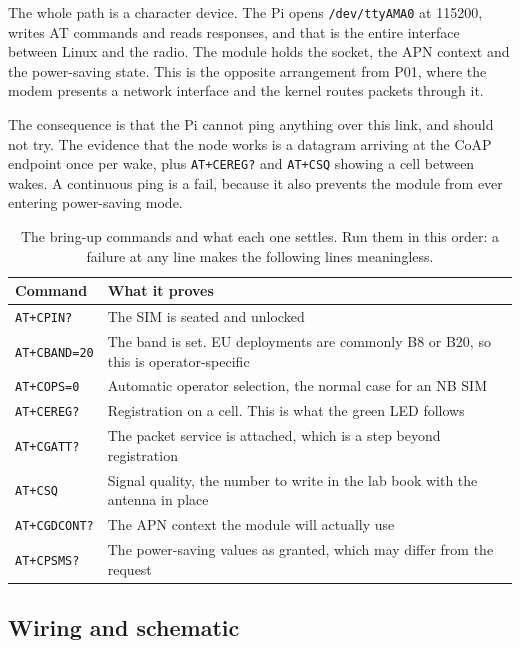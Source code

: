 The whole path is a character device. The Pi opens \texttt{/dev/ttyAMA0} at 115200, writes AT commands and reads responses, and that is the entire interface between Linux and the radio. The module holds the socket, the APN context and the power-saving state. This is the opposite arrangement from P01, where the modem presents a network interface and the kernel routes packets through it.

The consequence is that the Pi cannot ping anything over this link, and should not try. The evidence that the node works is a datagram arriving at the CoAP endpoint once per wake, plus \texttt{AT+CEREG?} and \texttt{AT+CSQ} showing a cell between wakes. A continuous ping is a fail, because it also prevents the module from ever entering power-saving mode.

\begin{table}[H]\centering\small
\begin{tabular}{p{34mm}p{112mm}}
\toprule
Command & What it proves \\
\midrule
\texttt{AT+CPIN?} & The SIM is seated and unlocked \\
\texttt{AT+CBAND=20} & The band is set. EU deployments are commonly B8 or B20, so this is operator-specific \\
\texttt{AT+COPS=0} & Automatic operator selection, the normal case for an NB SIM \\
\texttt{AT+CEREG?} & Registration on a cell. This is what the green LED follows \\
\texttt{AT+CGATT?} & The packet service is attached, which is a step beyond registration \\
\texttt{AT+CSQ} & Signal quality, the number to write in the lab book with the antenna in place \\
\texttt{AT+CGDCONT?} & The APN context the module will actually use \\
\texttt{AT+CPSMS?} & The power-saving values as granted, which may differ from the request \\
\bottomrule
\end{tabular}
\caption{The bring-up commands and what each one settles. Run them in this order: a failure at any line makes the following lines meaningless.}
\end{table}

\subsection*{Wiring and schematic}

